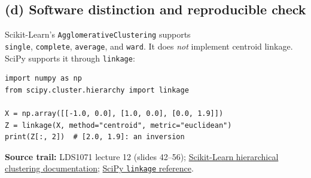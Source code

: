 \subsection*{(d) Software distinction and reproducible check}
Scikit-Learn's \texttt{AgglomerativeClustering} supports\\
\texttt{single}, \texttt{complete}, \texttt{average}, and \texttt{ward}. It does \emph{not} implement centroid linkage. SciPy supports it through \texttt{linkage}:
\begin{lstlisting}
import numpy as np
from scipy.cluster.hierarchy import linkage

X = np.array([[-1.0, 0.0], [1.0, 0.0], [0.0, 1.9]])
Z = linkage(X, method="centroid", metric="euclidean")
print(Z[:, 2])  # [2.0, 1.9]: an inversion
\end{lstlisting}
\textbf{Source trail:} LDS1071 lecture 12 (slides 42--56); \href{https://scikit-learn.org/stable/modules/clustering.html}{Scikit-Learn hierarchical clustering documentation}; \href{https://docs.scipy.org/doc/scipy/reference/generated/scipy.cluster.hierarchy.linkage.html}{SciPy \texttt{linkage} reference}.

